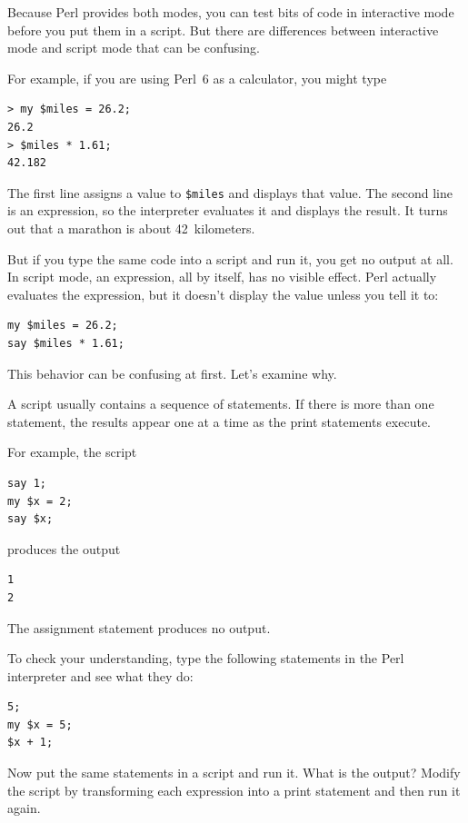 Because Perl provides both modes,
you can test bits of code in interactive mode before you put them
in a script.  But there are differences between interactive mode
and script mode that can be confusing.

For example, if you are using Perl~6 as a calculator, you might type

\begin{verbatim}
> my $miles = 26.2;
26.2
> $miles * 1.61;
42.182
\end{verbatim}

The first line assigns a value to {\tt \$miles} and displays that value.  
The second line is an expression, so the
interpreter evaluates it and displays the result.  It turns out that a
marathon is about 42~kilometers.

But if you type the same code into a script and run it, you get no
output at all.  In script mode, an expression, all by itself, has no
visible effect.  Perl actually evaluates the expression, but it doesn't
display the value unless you tell it to:

\begin{verbatim}
my $miles = 26.2;
say $miles * 1.61;
\end{verbatim}

This behavior can be confusing at first. Let's examine why.

A script usually contains a sequence of statements.  If there
is more than one statement, the results appear one at a time
as the print statements execute.

For example, the script

\begin{verbatim}
say 1;
my $x = 2;
say $x;
\end{verbatim}
%
produces the output

\begin{verbatim}
1
2
\end{verbatim}
%
The assignment statement produces no output.

To check your understanding, type the following statements in the
Perl interpreter and see what they do:

\begin{verbatim}
5;
my $x = 5;
$x + 1;
\end{verbatim}

Now put the same statements in a script and run it.  What
is the output?  Modify the script by transforming each
expression into a print statement and then run it again.

